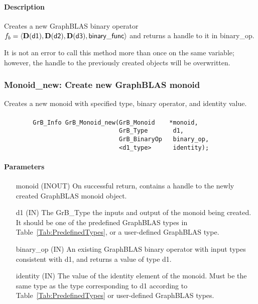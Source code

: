 \paragraph{Description}

Creates a new GraphBLAS binary operator $f_b = \langle \bold{D}({\sf d1}), 
\bold{D}({\sf d2}), \bold{D}({\sf d3}), {\sf binary\_func} \rangle$ and returns
a handle to it in {\sf binary\_op}.

It is not an error to call this method more than once on the same variable;  
however, the handle to the previously created objects will be overwritten. 


\subsubsection{{\sf Monoid\_new}: Create new GraphBLAS monoid}

Creates a new monoid with specified type, binary operator, and identity value.

\paragraph{\syntax}

\begin{verbatim}
        GrB_Info GrB_Monoid_new(GrB_Monoid    *monoid,
                                GrB_Type       d1,
                                GrB_BinaryOp   binary_op,
                                <d1_type>      identity);
\end{verbatim}

\paragraph{Parameters}

\begin{itemize}[leftmargin=1.1in]
    \item[{\sf monoid}] ({\sf INOUT}) On successful return, contains a
    handle to the newly created GraphBLAS monoid object.
    \item[{\sf d1}] ({\sf IN}) The {\sf GrB\_Type} the inputs and output of the 
    monoid being created. It should be one of the predefined GraphBLAS types in
    Table~\ref{Tab:PredefinedTypes}, or a user-defined GraphBLAS type.
    \item[{\sf binary\_op}] ({\sf IN}) An existing GraphBLAS binary operator with input types 
    consistent with {\sf d1}, and returns a value of type {\sf d1}. 
    \item[{\sf identity}]  ({\sf IN}) The value of the identity element of the 
    monoid. Must be the same type as the type corresponding to {\sf d1} according to
    Table~\ref{Tab:PredefinedTypes} or user-defined GraphBLAS types.
\end{itemize}

